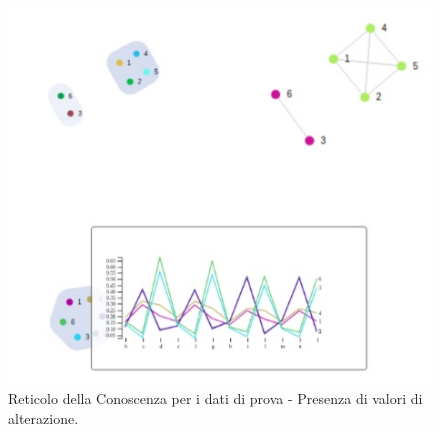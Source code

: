 \begin{figure}[H]
\centering
	\includegraphics[width=0.60\linewidth]{./image/collage_reticolo-general-PROBLEMA.png}
	\caption{Reticolo della Conoscenza per i dati di prova - Presenza di valori di alterazione.}
	\label{Reticolo della Conoscenza per i dati di prova - Presenza di valori di alterazione.}
\end{figure}
\noindent

